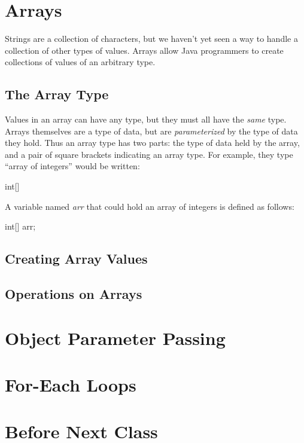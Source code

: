 \section{Arrays}

Strings are a collection of characters, but we haven't yet seen a way to handle a collection of other types of values. Arrays allow Java programmers to create collections of values of an arbitrary type. 

\subsection{The Array Type}

Values in an array can have any type, but they must all have the \textit{same} type. Arrays themselves are a type of data, but are \textit{parameterized} by the type of data they hold. Thus an array type has two parts: the type of data held by the array, and a pair of square brackets indicating an array type. For example, they type ``array of integers'' would be written:
\begin{code}
int[] 
\end{code}

A variable named \textit{arr} that could hold an array of integers is defined as follows:

\begin{code}
int[] arr;
\end{code}

\subsection{Creating Array Values}

\subsection{Operations on Arrays}

\section{Object Parameter Passing}
\section{For-Each Loops}

\section{Before Next Class}

